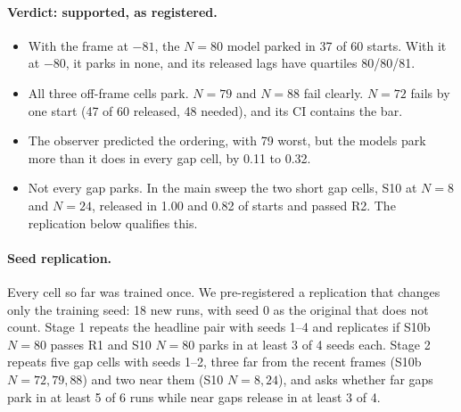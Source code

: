 \documentclass[11pt]{article}
\begin{document}
\paragraph{Verdict: supported, as registered.}
\begin{itemize}
\item With the frame at $-81$, the $N{=}80$ model parked in 37 of 60 starts. With it at $-80$, it parks in none, and
its released lags have quartiles 80/80/81.
\item All three off-frame cells park. $N{=}79$ and $N{=}88$ fail clearly. $N{=}72$ fails by one start (47 of 60
released, 48 needed), and its CI contains the bar.
\item The observer predicted the ordering, with 79 worst, but the models park more than it does in every gap cell,
by 0.11 to 0.32.
\item Not every gap parks. In the main sweep the two short gap cells, S10 at $N{=}8$ and $N{=}24$, released in 1.00
and 0.82 of starts and passed R2. The replication below qualifies this.
\end{itemize}

\paragraph{Seed replication.} Every cell so far was trained once. We pre-registered a replication that changes only
the training seed: 18 new runs, with seed 0 as the original that does not count. Stage 1 repeats the headline pair
with seeds 1--4 and replicates if S10b $N{=}80$ passes R1 and S10 $N{=}80$ parks in at least 3 of 4 seeds each.
Stage 2 repeats five gap cells with seeds 1--2, three far from the recent frames (S10b $N{=}72, 79, 88$) and two
near them (S10 $N{=}8, 24$), and asks whether far gaps park in at least 5 of 6 runs while near gaps release in at
least 3 of 4.
\end{document}

